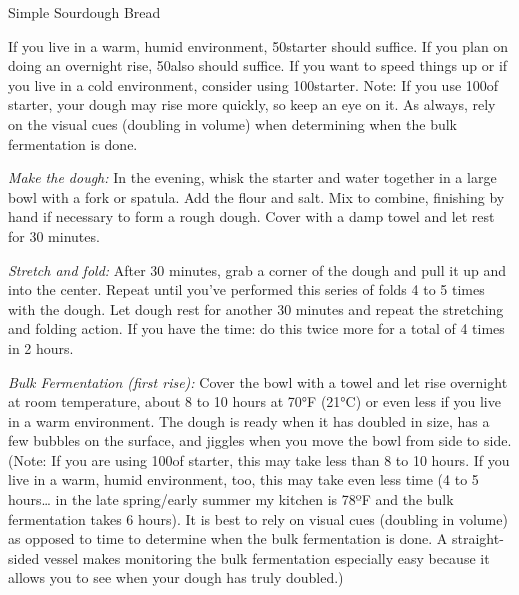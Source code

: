 \begin{recipe}[\vegan]{Simple Sourdough Bread}

    \begin{ingredients}
    \end{ingredients}

    \begin{instructions}
        If you live in a warm, humid environment, 50\gram starter should suffice. If you plan on doing an overnight rise, 50\gram also should suffice. If you want  to speed things up or if you live in a cold environment, consider using 100\gram starter. Note: If you use 100\gram of starter, your dough may rise more quickly, so keep an eye on it. As always, rely on the visual cues (doubling in volume) when determining when the bulk fermentation is done. 

        \emph{Make the dough:}
        In the evening, whisk the starter and water together in a large bowl with a fork or spatula.
        Add the flour and salt.
        Mix to combine, finishing by hand if necessary to form a rough dough.
        Cover with a damp towel and let rest for 30 minutes. 

        \emph{Stretch and fold:} After 30 minutes, grab a corner of the dough and pull it up and into the center.
        Repeat until you’ve performed this series of folds 4 to 5 times with the dough.
        Let dough rest for another 30 minutes and repeat the stretching and folding action.
        If you have the time: do this twice more for a total of 4 times in 2 hours.

        \emph{Bulk Fermentation (first rise):}
        Cover the bowl with a towel and let rise overnight at room temperature, about 8 to 10 hours at 70°F (21°C) or even less if you live in a warm environment.
        The dough is ready when it has doubled in size, has a few bubbles on the surface, and jiggles when you move the bowl from side to side.
        (Note: If you are using 100\gram of starter, this may take less than 8 to 10 hours. If you live in a warm, humid environment, too, this may take even less time (4 to 5 hours… in the late spring/early summer my kitchen is 78ºF and the bulk fermentation takes 6 hours).
        It is best to rely on visual cues (doubling in volume) as opposed to time to determine when the bulk fermentation is done.
        A straight-sided vessel makes monitoring the bulk fermentation especially easy because it allows you to see when your dough has truly doubled.)


\end{instructions}
\end{recipe}
